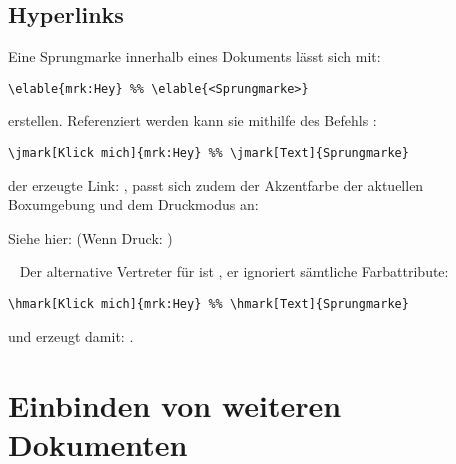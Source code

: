 \subsection{Hyperlinks}
Eine Sprungmarke innerhalb eines Dokuments lässt sich mit:
\begin{lstlisting}[style=latex]
\elable{mrk:Hey} %% \elable{<Sprungmarke>}
\end{lstlisting}
erstellen. Referenziert werden kann sie mithilfe des Befehls \textbf{}:
\begin{lstlisting}[style=latex]
\jmark[Klick mich]{mrk:Hey} %% \jmark[Text]{Sprungmarke}
\end{lstlisting}
der erzeugte Link: , passt sich zudem der Akzentfarbe der aktuellen Boxumgebung und dem Druckmodus an:\smallskip
\begin{zusammenfassung}[Testzusammenfassung]
Siehe hier:  (Wenn Druck: )
\end{zusammenfassung}~\smallskip\newline
{}Der alternative Vertreter für \textbf{} ist \textbf{}, er ignoriert sämtliche Farbattribute:
\begin{lstlisting}[style=latex]
\hmark[Klick mich]{mrk:Hey} %% \hmark[Text]{Sprungmarke}
\end{lstlisting}
und erzeugt damit: . 





\section{Einbinden von weiteren Dokumenten}

